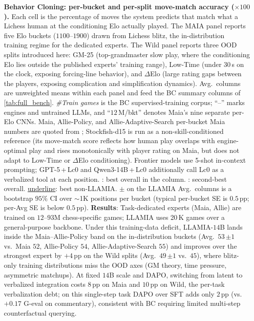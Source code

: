 \begin{table}[h!]
\centering
\caption{\textbf{Behavior Cloning: per-bucket and per-split move-match accuracy ($\times 100$).}
Each cell is the percentage of moves the system predicts that match what a Lichess human at the conditioning Elo actually played.
The MAIA panel reports five Elo buckets ($1100$--$1900$) drawn from Lichess blitz, the in-distribution training regime for the dedicated experts.
The Wild panel reports three OOD splits introduced here: GM-25 (top-grandmaster slow play, where the conditioning Elo lies outside the published experts' training range), Low-Time (under $30$\,s on the clock, exposing forcing-line behavior), and $\Delta$Elo (large rating gaps between the players, exposing complication and simplification dynamics).
Avg.\ columns are unweighted means within each panel and feed the BC summary columns of \cref{tab:full_bench}.
\emph{\#Train games} is the BC supervised-training corpus; ``--'' marks engines and untrained LLMs, and ``$12$\,M/bkt'' denotes Maia's nine separate per-Elo CNNs.
Maia, Allie-Policy, and Allie-Adaptive-Search per-bucket Maia numbers are quoted from \citet{mcilroy2020aligning, zhang2024humanalignedchessbitsearch}; Stockfish-d15 is run as a non-skill-conditioned reference (its move-match score reflects how human play overlaps with engine-optimal play and rises monotonically with player rating on Maia, but does not adapt to Low-Time or $\Delta$Elo conditioning). Frontier models use 5-shot in-context prompting; GPT-5\,+\,Lc0 and Qwen3-14B\,+\,Lc0 additionally call Lc0 as a verbalized tool at each position.
: best overall in the column.
: second-best overall.
\underline{underline}: best non-LLAMIA.
$\pm$ on the LLAMIA Avg.\ columns is a bootstrap $95\%$ CI over $\sim$1K positions per bucket (typical per-bucket SE is $0.5$\,pp; per-Avg SE is below $0.5$\,pp).
\textbf{Results}: Task-dedicated experts (Maia, Allie) are trained on $12$--$93$M chess-specific games; LLAMIA uses 20\,K games over a general-purpose backbone. Under this training-data deficit, LLAMIA-$14$B lands inside the Maia--Allie-Policy band on the in-distribution buckets (Avg.\ $53\,{\scriptstyle\pm 1}$ vs.\ Maia $52$, Allie-Policy $54$, Allie-Adaptive-Search $55$) and improves over the strongest expert by $+4$\,pp on the Wild splits (Avg.\ $49\,{\scriptstyle\pm 1}$ vs.\ $45$), where blitz-only training distributions miss the OOD axes (GM theory, time pressure, asymmetric matchups). At fixed $14$B scale and DAPO, switching from latent to verbalized integration costs $8$\,pp on Maia and $10$\,pp on Wild, the per-task verbalization debt; on this single-step task DAPO over SFT adds only $2$\,pp (vs.\ $+0.17$ G-eval on commentary), consistent with BC requiring limited multi-step counterfactual querying.}

\end{table}
